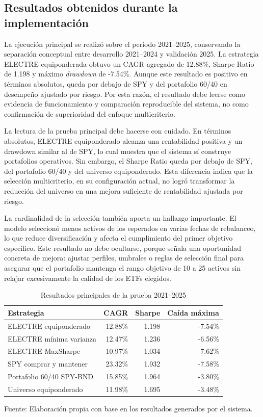 \documentclass[12pt,letterpaper]{article}
\newcommand{\fuente}[1]{\begin{center}\small Fuente: #1\end{center}}
\begin{document}
\subsection{Resultados obtenidos durante la implementación}

La ejecución principal se realizó sobre el período 2021--2025, conservando la separación conceptual entre desarrollo 2021--2024 y validación 2025. La estrategia ELECTRE equiponderada obtuvo un CAGR agregado de 12.88\%, Sharpe Ratio de 1.198 y máximo \textit{drawdown} de -7.54\%. Aunque este resultado es positivo en términos absolutos, queda por debajo de SPY y del portafolio 60/40 en desempeño ajustado por riesgo. Por esta razón, el resultado debe leerse como evidencia de funcionamiento y comparación reproducible del sistema, no como confirmación de superioridad del enfoque multicriterio.

La lectura de la prueba principal debe hacerse con cuidado. En términos absolutos, ELECTRE equiponderado alcanza una rentabilidad positiva y un drawdown similar al de SPY, lo cual muestra que el sistema sí construye portafolios operativos. Sin embargo, el Sharpe Ratio queda por debajo de SPY, del portafolio 60/40 y del universo equiponderado. Esta diferencia indica que la selección multicriterio, en su configuración actual, no logró transformar la reducción del universo en una mejora suficiente de rentabilidad ajustada por riesgo.

La cardinalidad de la selección también aporta un hallazgo importante. El modelo seleccionó menos activos de los esperados en varias fechas de rebalanceo, lo que reduce diversificación y afecta el cumplimiento del primer objetivo específico. Este resultado no debe ocultarse, porque señala una oportunidad concreta de mejora: ajustar perfiles, umbrales o reglas de selección final para asegurar que el portafolio mantenga el rango objetivo de 10 a 25 activos sin relajar excesivamente la calidad de los ETFs elegidos.


\begin{table}[H]
\centering
\caption{Resultados principales de la prueba 2021--2025}
\label{tab:resultados_principales}
\begin{tabular}{p{5.0cm}rrr}
\toprule
\textbf{Estrategia} & \textbf{CAGR} & \textbf{Sharpe} & \textbf{Caída máxima} \\
\midrule
ELECTRE equiponderado & 12.88\% & 1.198 & -7.54\% \\
ELECTRE mínima varianza & 12.47\% & 1.236 & -6.56\% \\
ELECTRE MaxSharpe & 10.97\% & 1.034 & -7.62\% \\
SPY comprar y mantener & 23.32\% & 1.932 & -7.58\% \\
Portafolio 60/40 SPY-BND & 15.85\% & 1.964 & -3.80\% \\
Universo equiponderado & 11.98\% & 1.695 & -3.48\% \\
\bottomrule
\end{tabular}
\end{table}
\fuente{Elaboración propia con base en los resultados generados por el sistema.}
\end{document}
